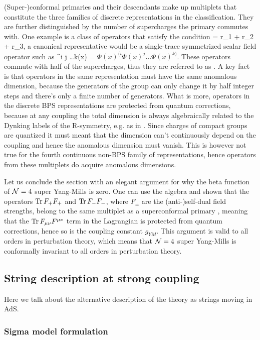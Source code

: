 (Super-)conformal primaries and their descendants make up multiplets that constitute the three families of discrete representations in the classification.
They are further distinguished by the number of supercharges the primary commutes with.
One example is a class of operators that satisfy the condition 
\beq
	\label{eq:halfBPS}
	\Delta = r_1 + r_2 + r_3,
\eeq 
a canonical representative would be a single-trace symmetrized scalar field operator such as 
\beq
	^{i j \dots k}(x) = \tr \( \Phi(x)^{(i} \Phi(x)^j \dots \Phi(x)^{k)} \).
\eeq
These operators commute with half of the supercharges, thus they are referred to as . 
A key fact is that operators in the same representation must have the same anomalous dimension, because the generators of the group can only change it by half integer steps and there's only a finite number of generators. 
What is more, operators in the discrete BPS representations are protected from quantum corrections, because at any coupling the total dimension is always algebraically related to the Dynking labels of the R-symmetry, e.g. as in . 
Since charges of compact groups are quantized it must meant that the dimension can't continuously depend on the coupling and hence the anomalous dimension must vanish. 
This is however not true for the fourth continuous non-BPS family of representations, hence operators from these multiplets do acquire anomalous dimensions.

Let us conclude the section with an elegant argument for why the beta function of $\mathcal{N}=4$ super Yang-Mills is zero.
One can use the algebra and shown that the operators $\mathrm{Tr} \, F_+ F_+$ and $\mathrm{Tr} \, F_- F_- $, where $F_\pm$ are the (anti-)self-dual field strengths, belong to the same multiplet as a superconformal primary \cite{Minahan:2010js}, meaning that the $\mathrm{Tr} \, F_{\mu\nu} F^{\mu\nu}$ term in the Lagrangian is protected from quantum corrections, hence so is the coupling constant $g_{YM}$. 
This argument is valid to all orders in perturbation theory, which means that $\mathcal{N}=4$ super Yang-Mills is conformally invariant to all orders in perturbation theory.

\subsection{String description at strong coupling}

Here we talk about the alternative description of the theory as strings moving in AdS.

\subsubsection{Sigma model formulation}

